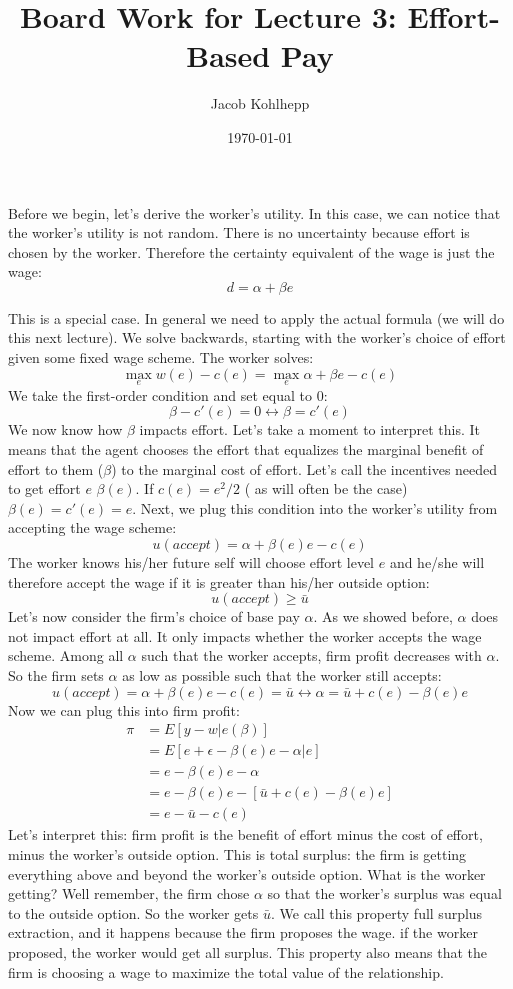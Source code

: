 \documentclass{article}
\title{Board Work for Lecture 3: Effort-Based Pay}
\author{Jacob Kohlhepp}
\date{\today}
\begin{document}
\maketitle

Before we begin, let's derive the worker's utility. In this case, we can notice that the worker's utility is not random. There is no uncertainty because effort is chosen by the worker. Therefore the certainty equivalent of the wage is just the wage:
\[d = \alpha + \beta e\]

This is a special case. In general we need to apply the actual formula (we will do this next lecture). We solve backwards, starting with the worker's choice of effort given some fixed wage scheme. The worker solves:
\[\max_e w(e) - c(e) = \max_e \alpha + \beta e - c(e)\]
We take the first-order condition and set equal to 0:
\[\beta -c'(e)=0 \leftrightarrow \beta = c'(e)\]
We now know how $\beta$ impacts effort. Let's take a moment to interpret this. It means that the agent chooses the effort that equalizes the marginal benefit of effort to them ($\beta$) to the marginal cost of effort. Let's call the incentives needed to get effort $e$ $\beta(e)$. If $c(e)=e^2/2$ ( as will often be the case) $\beta(e)=c'(e)=e$. Next, we plug this condition into the worker's utility from accepting the wage scheme:
\[u(accept) = \alpha + \beta(e) e-c(e) \]
The worker knows his/her future self will choose effort level $e$ and he/she will therefore accept the wage if it is greater than his/her outside option:
\[u(accept) \geq \bar u\]
Let's now consider the firm's choice of base pay $\alpha$. As we showed before, $\alpha$ does not impact effort at all. It only impacts whether the worker accepts the wage scheme. Among all $\alpha$ such that the worker accepts, firm profit decreases with $\alpha$. So the firm sets $\alpha$ as low as possible such that the worker still accepts:
\[u(accept) = \alpha + \beta(e) e-c(e)=\bar u \leftrightarrow \alpha = \bar u +c(e)-\beta(e) e  \]
Now we can plug this into firm profit:
\begin{align}
    \pi&= E[y-w|e(\beta)]\\
    &= E[e+\epsilon - \beta(e) e -\alpha |e]\\
    &= e - \beta(e) e-\alpha \\
    &= e - \beta(e) e - [\bar u +c(e)-\beta(e) e]\\
    &=e - \bar u-c(e)
\end{align}
Let's interpret this: firm profit is the benefit of effort minus the cost of effort, minus the worker's outside option. This is total surplus: the firm is getting everything above and beyond the worker's outside option. What is the worker getting? Well remember, the firm chose $\alpha$ so that the worker's surplus was equal to the outside option. So the worker gets $\bar u$. We call this property full surplus extraction, and it happens because the firm proposes the wage. if the worker proposed, the worker would get all surplus. This property also means that the firm is choosing a wage to maximize the total value of the relationship.
\end{document}
